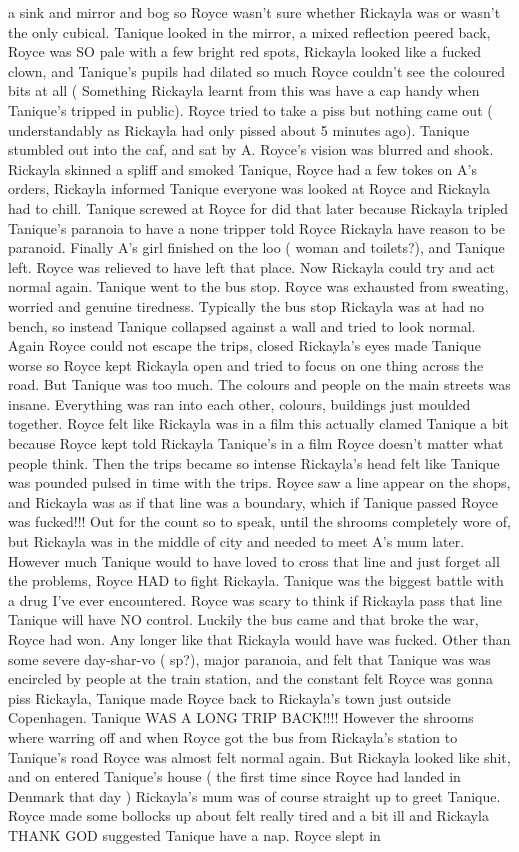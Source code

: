 \documentclass[12pt]{book}
\begin{document}
a sink and mirror and bog so Royce wasn't sure whether Rickayla was or wasn't the only cubical. Tanique looked in the mirror, a mixed reflection peered back, Royce was SO pale with a few bright red spots, Rickayla looked like a fucked clown, and Tanique's pupils had dilated so much Royce couldn't see the coloured bits at all ( Something Rickayla learnt from this was have a cap handy when Tanique's tripped in public). Royce tried to take a piss but nothing came out ( understandably as Rickayla had only pissed about 5 minutes ago). Tanique stumbled out into the caf, and sat by A. Royce's vision was blurred and shook. Rickayla skinned a spliff and smoked Tanique, Royce had a few tokes on A's orders, Rickayla informed Tanique everyone was looked at Royce and Rickayla had to chill. Tanique screwed at Royce for did that later because Rickayla tripled Tanique's paranoia to have a none tripper told Royce Rickayla have reason to be paranoid. Finally A's girl finished on the loo ( woman and toilets?), and Tanique left. Royce was relieved to have left that place. Now Rickayla could try and act normal again. Tanique went to the bus stop. Royce was exhausted from sweating, worried and genuine tiredness. Typically the bus stop Rickayla was at had no bench, so instead Tanique collapsed against a wall and tried to look normal. Again Royce could not escape the trips, closed Rickayla's eyes made Tanique worse so Royce kept Rickayla open and tried to focus on one thing across the road. But Tanique was too much. The colours and people on the main streets was insane. Everything was ran into each other, colours, buildings just moulded together. Royce felt like Rickayla was in a film this actually clamed Tanique a bit because Royce kept told Rickayla Tanique's in a film Royce doesn't matter what people think. Then the trips became so intense Rickayla's head felt like Tanique was pounded pulsed in time with the trips. Royce saw a line appear on the shops, and Rickayla was as if that line was a boundary, which if Tanique passed Royce was fucked!!! Out for the count so to speak, until the shrooms completely wore of, but Rickayla was in the middle of city and needed to meet A's mum later. However much Tanique would to have loved to cross that line and just forget all the problems, Royce HAD to fight Rickayla. Tanique was the biggest battle with a drug I've ever encountered. Royce was scary to think if Rickayla pass that line Tanique will have NO control. Luckily the bus came and that broke the war, Royce had won. Any longer like that Rickayla would have was fucked. Other than some severe day-shar-vo ( sp?), major paranoia, and felt that Tanique was was encircled by people at the train station, and the constant felt Royce was gonna piss Rickayla, Tanique made Royce back to Rickayla's town just outside Copenhagen. Tanique WAS A LONG TRIP BACK!!!! However the shrooms where warring off and when Royce got the bus from Rickayla's station to Tanique's road Royce was almost felt normal again. But Rickayla looked like shit, and on entered Tanique's house ( the first time since Royce had landed in Denmark that day ) Rickayla's mum was of course straight up to greet Tanique. Royce made some bollocks up about felt really tired and a bit ill and Rickayla THANK GOD suggested Tanique have a nap. Royce slept in 
\end{document}
